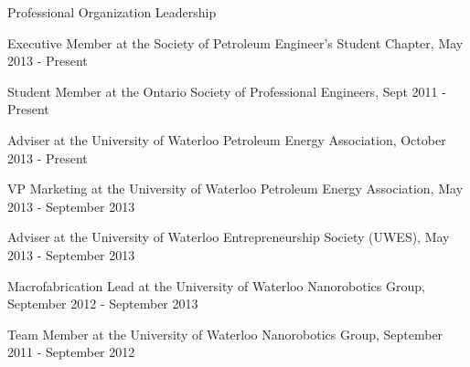 \documentclass{resume} %
\begin{document}
\begin{rSection}{Professional Organization Leadership}

\item Executive Member at the Society of Petroleum Engineer's Student Chapter, May 2013 - Present
\item Student Member at the Ontario Society of Professional Engineers, Sept 2011 - Present
\item Adviser at the University of Waterloo Petroleum Energy Association,  October 2013 - Present
\item VP Marketing at the University of Waterloo Petroleum Energy Association, May 2013 - September 2013
\item Adviser at the University of Waterloo Entrepreneurship Society (UWES), May 2013 - September 2013
\item Macrofabrication Lead at the University of Waterloo Nanorobotics Group, September 2012 - September 2013
\item Team Member at the University of Waterloo Nanorobotics Group, September 2011 - September 2012


\end{rSection}	



\end{document}
